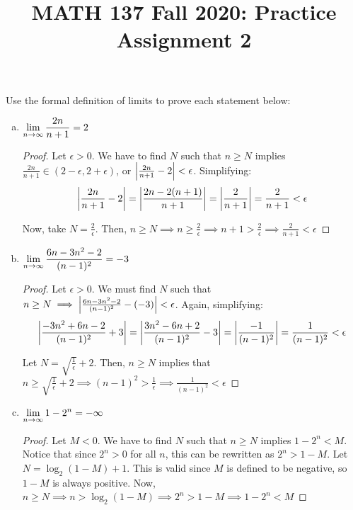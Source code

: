 
\title{MATH 137 Fall 2020: Practice Assignment 2}


\thispagestyle{firstpage}

\textbf{\@title}

\question Use the formal definition of limits to prove each statement below:

\begin{enumerate}[(a)]

  \item $\displaystyle\lim_{n\to\infty}\frac{2n}{n+1}=2$
        \begin{proof}
          Let $\epsilon>0$.
          We have to find $N$ such that $n\geq N$ implies $\frac{2n}{n+1}\in(2-\epsilon,2+\epsilon)$, or $\abs{\frac{2n}{n+1}-2}<\epsilon$.
          Simplifying:
          \[ \abs{\frac{2n}{n+1}-2} = \abs{\frac{2n-2(n+1)}{n+1}} = \abs{\frac{2}{n+1}} = \frac{2}{n+1} < \epsilon \]

          Now, take $N=\frac2\epsilon$.
          Then, $n\geq N\implies n\geq\frac2\epsilon\implies n+1>\frac2\epsilon\implies\frac2{n+1}<\epsilon$
        \end{proof}

  \item $\displaystyle\lim_{n\to\infty}\frac{6n-3n^2-2}{(n-1)^2}=-3$
        \begin{proof}
          Let $\epsilon>0$. We must find $N$ such that $n\geq N\implies \abs{\frac{6n-3n^2-2}{(n-1)^2}-(-3)}<\epsilon$. Again, simplifying:
          \[ \abs{\frac{-3n^2+6n-2}{(n-1)^2}+3} = \abs{\frac{3n^2-6n+2}{(n-1)^2}-3} = \abs{\frac{-1}{(n-1)^2}}= \frac{1}{(n-1)^2} < \epsilon \]

          Let $N=\sqrt{\frac1\epsilon}+2$. Then, $n\geq N$ implies that $n\geq\sqrt{\frac1\epsilon}+2 \implies (n-1)^2>\frac1\epsilon\implies\frac{1}{(n-1)^2}<\epsilon$
        \end{proof}

  \item $\displaystyle\lim_{n\to\infty}1-2^n=-\infty$
        \begin{proof}
          Let $M<0$. We have to find $N$ such that $n\geq N$ implies $1-2^n<M$. Notice that since $2^n>0$ for all $n$, this can be rewritten as $2^n>1-M$. Let $N=\log_2(1-M)+1$. This is valid since $M$ is defined to be negative, so $1-M$ is always positive. Now, $n\geq N\implies n>\log_2(1-M)\implies 2^n>1-M\implies1-2^n<M$
        \end{proof}

\end{enumerate}




